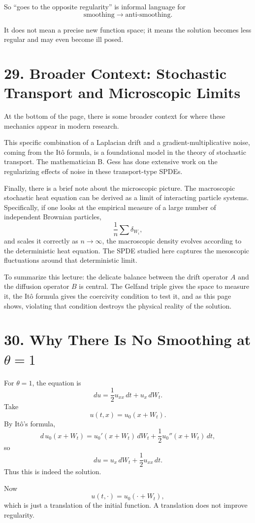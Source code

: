 \documentclass[11pt]{article}
\theoremstyle{definition}
\theoremstyle{remark}
\begin{document}
So ``goes to the opposite regularity'' is informal language for
\[
\text{smoothing} \longrightarrow \text{anti-smoothing}.
\]

It does not mean a precise new function space; it means the solution becomes less regular and may even become ill posed.

\section*{29. Broader Context: Stochastic Transport and Microscopic Limits}
At the bottom of the page, there is some broader context for where these mechanics appear in modern research.

This specific combination of a Laplacian drift and a gradient-multiplicative noise, coming from the It\^o formula, is a foundational model in the theory of stochastic transport. The mathematician B. Gess has done extensive work on the regularizing effects of noise in these transport-type SPDEs.

Finally, there is a brief note about the microscopic picture. The macroscopic stochastic heat equation can be derived as a limit of interacting particle systems. Specifically, if one looks at the empirical measure of a large number of independent Brownian particles,
\[
\frac{1}{n}\sum \delta_{W_i},
\]
and scales it correctly as $n\to\infty$, the macroscopic density evolves according to the deterministic heat equation. The SPDE studied here captures the mesoscopic fluctuations around that deterministic limit.

To summarize this lecture: the delicate balance between the drift operator $A$ and the diffusion operator $B$ is central. The Gelfand triple gives the space to measure it, the It\^o formula gives the coercivity condition to test it, and as this page shows, violating that condition destroys the physical reality of the solution.


\section*{30. Why There Is No Smoothing at $\theta=1$}
For $\theta=1$, the equation is
\[
du=\frac12 u_{xx}\,dt+u_x\,dW_t.
\]
Take
\[
u(t,x)=u_0(x+W_t).
\]
By It\^o's formula,
\[
d\,u_0(x+W_t)=u_0'(x+W_t)\,dW_t+\frac12 u_0''(x+W_t)\,dt,
\]
so
\[
du=u_x\,dW_t+\frac12 u_{xx}\,dt.
\]
Thus this is indeed the solution.

Now
\[
u(t,\cdot)=u_0(\cdot+W_t),
\]
which is just a translation of the initial function. A translation does not improve regularity.
\end{document}
